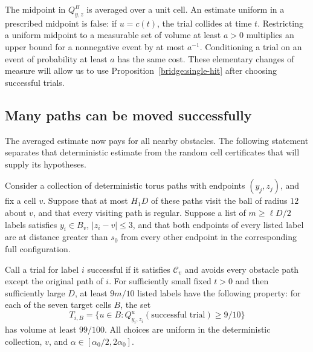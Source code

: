 \begin{remark}\label{bridge:midpoint-quantifier}
The midpoint in $Q_{y,z}^{B}$ is averaged over a unit cell.  An estimate
uniform in a prescribed midpoint is false: if $u=c(t)$, the trial
collides at time $t$.  Restricting a uniform midpoint to a measurable
set of volume at least $a>0$ multiplies an upper bound for a nonnegative
event by at most $a^{-1}$.  Conditioning a trial on an event of
probability at least $a$ has the same cost.  These elementary changes
of measure will allow us to use
Proposition~\ref{bridge:single-hit} after choosing successful trials.
\end{remark}

\subsection{Many paths can be moved successfully}

The averaged estimate now pays for all nearby obstacles.  The following
statement separates that deterministic estimate from the random cell
certificates that will supply its hypotheses.

\begin{corollary}\label{bridge:success-supply}
Consider a collection of deterministic torus paths with endpoints
$(y_j,z_j)$, and fix a cell $v$.  Suppose that at most $H_1D$ of these
paths visit the ball of radius $12$ about $v$, and that every visiting
path is regular.  Suppose a list of $m\ge\ell D/2$ labels satisfies
$y_i\in B_v$, $|z_i-v|\le3$, and that both endpoints of every listed
label are at distance greater than $s_0$ from every other endpoint in
the corresponding full configuration.

Call a trial for label $i$ successful if it satisfies $\mathcal C_v$
and avoids every obstacle path except the original path of $i$.
For sufficiently small fixed $t>0$ and then sufficiently large $D$,
at least $9m/10$ listed labels have the following property: for each
of the seven target cells $B$, the set
\begin{equation}\label{bridge:successful-target-set}
 T_{i,B}=\{u\in B:
     Q_{y_i,z_i}^u(\text{successful trial})\ge9/10\}
\end{equation}
has volume at least $99/100$.
All choices are uniform in the deterministic collection, $v$, and
$\alpha\in[\alpha_0/2,2\alpha_0]$.
\end{corollary}

